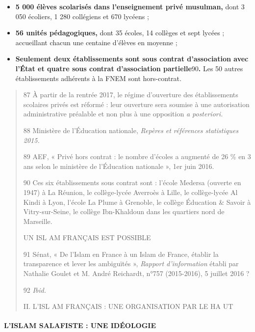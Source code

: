 \begin{itemize}
\item
  \textbf{5 000 élèves scolarisés dans l'enseignement privé musulman,}
  dont 3 050 écoliers, 1 280 collégiens et 670 lycéens ;
\item
  \textbf{56 unités pédagogiques,} dont 35 écoles, 14 collèges et sept
  lycées ; accueillant chacun une centaine d'élèves en moyenne ;
\end{itemize}

\begin{itemize}
\item
  \textbf{Seulement deux établissements sont sous contrat d'association
  avec l'État et quatre sous contrat d'association
  partielle}90\textbf{.} Les 50 autres établissements adhérents à la
  FNEM sont hors-contrat.
\end{itemize}

\begin{quote}
87 À partir de la rentrée 2017, le régime d'ouverture des établissements
scolaires privés est réformé : leur ouverture sera soumise à une
autorisation administrative préalable et non plus à une opposition
\emph{a posteriori.}

88 Ministère de l'Éducation nationale, \emph{Repères et références
statistiques 2015.}

89 AEF, « Privé hors contrat : le nombre d'écoles a augmenté de 26 \% en
3 ans selon le ministère de l'Éducation nationale », 1er juin 2016.

90 Ces six établissements sous contrat sont : l'école Medersa (ouverte
en 1947) à La Réunion, le collège-lycée Averroès à Lille, le
collège-lycée Al Kindi à Lyon, l'école La Plume à Grenoble, le collège
Éducation \& Savoir à Vitry-sur-Seine, le collège Ibn-Khaldoun dans les
quartiers nord de Marseille.

UN ISL AM FRANÇAIS EST POSSIBLE

91 Sénat, « De l'Islam en France à un Islam de France, établir la
transparence et lever les ambiguïtés », \emph{Rapport d'information}
établi par Nathalie Goulet et M. André Reichardt, n°757 (2015-2016), 5
juillet 2016 ?

92 \emph{Ibid.}

II. L'ISL AM FRANÇAIS : UNE ORGANISATION PAR LE HA UT
\end{quote}

\hypertarget{lislam-salafiste-une-iduxe9ologie}{%
\paragraph{L'ISLAM SALAFISTE : UNE
IDÉOLOGIE}\label{lislam-salafiste-une-iduxe9ologie}}

